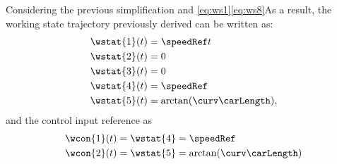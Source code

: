 {\begin{minipage}{\textwidth}
						Considering the previous simplification and \eqref{eq:ws1}\textendash\eqref{eq:ws8}As a result, the working state trajectory previously derived can be written as: 
						\begin{align}
							\wstat{1}(t) & = \speedRef t 					\label{eq:wss1}\\
							\wstat{2}(t) & = 0 								\label{eq:wss2}\\
							\wstat{3}(t) & = 0 								\label{eq:wss3}\\
							\wstat{4}(t) & = \speedRef 						\label{eq:wss4}\\
							\wstat{5}(t) & = \arctan( \curv \carLength ),    \label{eq:wss5}
						\end{align}
						and the control input reference as 
						\begin{align}
							\wcon{1}(t) & = \wstat{4} = \speedRef\label{eq:wc1}\\
							\wcon{2}(t) & = \wstat{5} = \arctan( \curv \carLength )\label{eq:wc2}
						\end{align}
					\end{minipage}
				}
			\fi	
			\if{}
				\scriptsize
